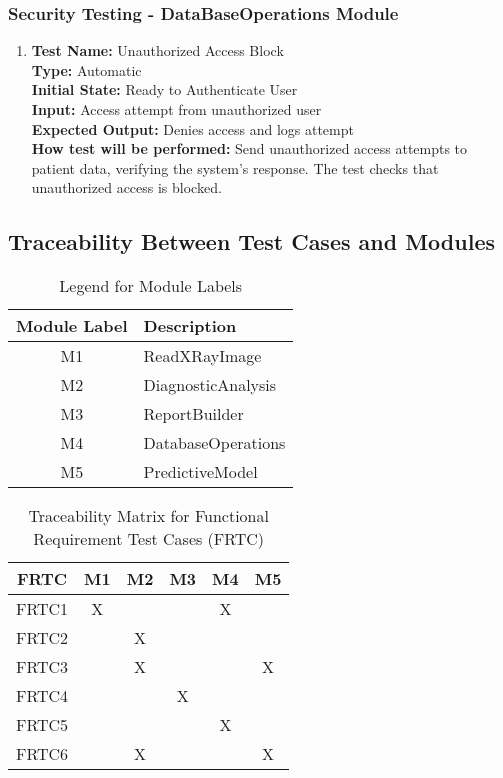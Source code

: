 \documentclass[12pt, titlepage]{article}
\begin{document}
\subsubsection{Security Testing - DataBaseOperations Module}
\begin{enumerate}
  \item \textbf{Test Name:}  Unauthorized Access Block\\
    \textbf{Type:}  Automatic\\
    \textbf{Initial State:}  Ready to Authenticate User\\
    \textbf{Input:}  Access attempt from unauthorized user\\
    \textbf{Expected Output:}  Denies access and logs attempt\\
    \textbf{How test will be performed:}  Send unauthorized access attempts to patient data, verifying the system’s response. The test checks that unauthorized access is blocked.\\
\end{enumerate}

\subsection{Traceability Between Test Cases and Modules}

\begin{table}[h!]
  \centering
  \caption{Legend for Module Labels}
  \begin{tabular}{|c|l|}
    \hline
    \textbf{Module Label} & \textbf{Description} \\
    \hline
    M1 & ReadXRayImage \\
    \hline
    M2 & DiagnosticAnalysis \\
    \hline
    M3 & ReportBuilder \\
    \hline
    M4 & DatabaseOperations \\
    \hline
    M5 & PredictiveModel \\
    \hline
  \end{tabular}
\end{table}

\begin{table}[h!]
  \centering
  \caption{Traceability Matrix for Functional Requirement Test Cases (FRTC)}
  \begin{tabular}{|c|c|c|c|c|c|}
    \hline
    \textbf{FRTC} & \textbf{M1} & \textbf{M2} & \textbf{M3} & \textbf{M4} & \textbf{M5} \\
    \hline
    FRTC1 & X &  &  & X &  \\
    \hline
    FRTC2 &  & X &  &  &  \\
    \hline
    FRTC3 &  & X &  &  & X \\
    \hline
    FRTC4 &  &  & X &  &  \\
    \hline
    FRTC5 &  &  &  & X &  \\
    \hline
    FRTC6 &  & X &  &  & X \\
    \hline
  \end{tabular}
\end{table}
\end{document}
